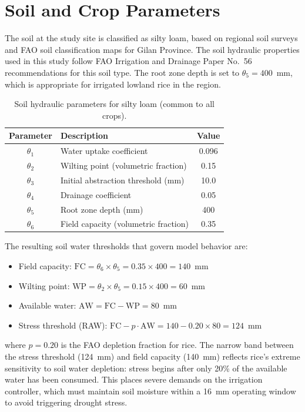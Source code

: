 \section{Soil and Crop Parameters}
\label{sec:soil_crop}

The soil at the study site is classified as silty loam, based on regional soil surveys and FAO soil classification maps for Gilan Province. The soil hydraulic properties used in this study follow FAO Irrigation and Drainage Paper No.~56 recommendations for this soil type. The root zone depth is set to $\theta_5 = 400$~mm, which is appropriate for irrigated lowland rice in the region.

\begin{table}[htbp]
\centering
\caption{Soil hydraulic parameters for silty loam (common to all crops).}
\label{tab:soil}
\begin{tabular}{clc}
\toprule
\textbf{Parameter} & \textbf{Description} & \textbf{Value} \\
\midrule
$\theta_1$ & Water uptake coefficient & 0.096 \\
$\theta_2$ & Wilting point (volumetric fraction) & 0.15 \\
$\theta_3$ & Initial abstraction threshold (mm) & 10.0 \\
$\theta_4$ & Drainage coefficient & 0.05 \\
$\theta_5$ & Root zone depth (mm) & 400 \\
$\theta_6$ & Field capacity (volumetric fraction) & 0.35 \\
\bottomrule
\end{tabular}
\end{table}

The resulting soil water thresholds that govern model behavior are:
\begin{itemize}
    \item Field capacity: $\text{FC} = \theta_6 \times \theta_5 = 0.35 \times 400 = 140$~mm
    \item Wilting point: $\text{WP} = \theta_2 \times \theta_5 = 0.15 \times 400 = 60$~mm
    \item Available water: $\text{AW} = \text{FC} - \text{WP} = 80$~mm
    \item Stress threshold (RAW): $\text{FC} - p \cdot \text{AW} = 140 - 0.20 \times 80 = 124$~mm
\end{itemize}
where $p = 0.20$ is the FAO depletion fraction for rice. The narrow band between the stress threshold (124~mm) and field capacity (140~mm) reflects rice's extreme sensitivity to soil water depletion: stress begins after only 20\% of the available water has been consumed. This places severe demands on the irrigation controller, which must maintain soil moisture within a 16~mm operating window to avoid triggering drought stress.

